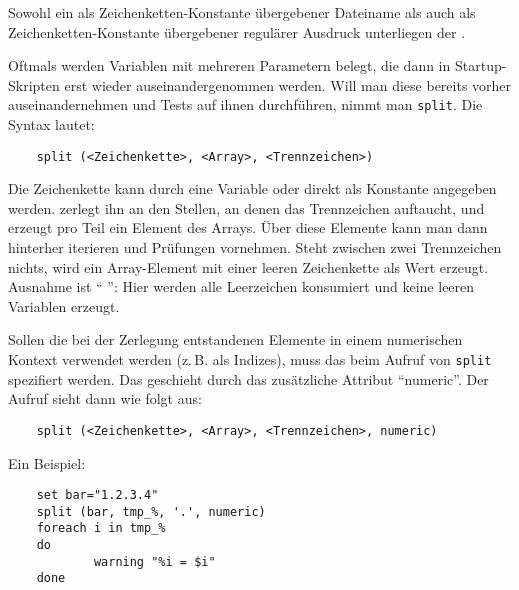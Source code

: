     Sowohl ein als Zeichenketten-Konstante übergebener Dateiname als auch als
    Zeichenketten-Konstante übergebener regulärer Ausdruck unterliegen der
    .


    Oftmals werden Variablen mit mehreren Parametern belegt, die dann
    in Startup-Skripten erst wieder auseinandergenommen werden. Will
    man diese bereits vorher auseinandernehmen und Tests auf ihnen
    durchführen, nimmt man \texttt{split}. Die Syntax lautet:

\begin{example}
\begin{verbatim}
    split (<Zeichenkette>, <Array>, <Trennzeichen>)
\end{verbatim}
\end{example}

    Die Zeichenkette kann durch eine Variable oder direkt als
    Konstante angegeben werden.  zerlegt ihn an den Stellen, an
    denen das Trennzeichen auftaucht, und erzeugt pro Teil ein Element des
    Arrays. Über diese Elemente kann man dann hinterher iterieren und Prüfungen
    vornehmen. Steht zwischen zwei Trennzeichen nichts, wird ein Array-Element
    mit einer leeren Zeichenkette als Wert erzeugt. Ausnahme ist "` "':
    Hier werden alle Leerzeichen konsumiert und keine leeren Variablen
    erzeugt.

    Sollen die bei der Zerlegung entstandenen Elemente in einem
    numerischen Kontext verwendet werden (z.\,B. als Indizes), muss das
    beim Aufruf von \texttt{split} spezifiert werden. Das geschieht durch das
    zusätzliche Attribut "`numeric"'. Der Aufruf sieht dann wie folgt
    aus:

\begin{example}
\begin{verbatim}
    split (<Zeichenkette>, <Array>, <Trennzeichen>, numeric)
\end{verbatim}
\end{example}

   Ein Beispiel:

\begin{example}
\begin{verbatim}
    set bar="1.2.3.4"
    split (bar, tmp_%, '.', numeric)
    foreach i in tmp_%
    do
            warning "%i = $i"
    done
\end{verbatim}
\end{example}


